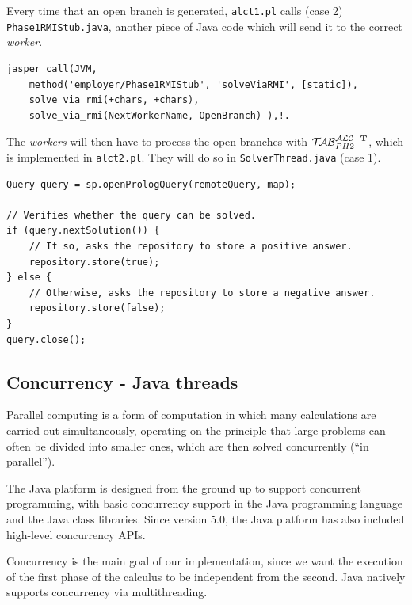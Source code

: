 \documentclass[a4paper, 11pt, oneside]{duthesis}
\newcommand{\tip}{{\bf T}}
\newcommand{\secondo}{\mathrel{{\mathcal{T}\!\mathcal{AB}}}_{PH 2}^{\mathcal{ALC}+\mbox{\scriptsize $\tip$}}}
\begin{document}
Every time that an open branch is generated, \verb$alct1.pl$ calls (case 2) \verb$Phase1RMIStub.java$, another piece of Java code which will send it to the correct \emph{worker}.

\begin{lstlisting}[caption={alct1.pl}, label={lst:alct1}, firstnumber=293]
jasper_call(JVM,
	method('employer/Phase1RMIStub', 'solveViaRMI', [static]),
	solve_via_rmi(+chars, +chars),                      
	solve_via_rmi(NextWorkerName, OpenBranch) ),!.
\end{lstlisting}\vspace{0.5cm}

The \emph{workers} will then have to process the open branches with $\secondo$, which is implemented in \verb$alct2.pl$. They will do so in \verb$SolverThread.java$ (case 1).

\begin{lstlisting}[caption={SolverThread.java}, label={lst:solvert}, firstnumber=22]
Query query = sp.openPrologQuery(remoteQuery, map);

// Verifies whether the query can be solved.
if (query.nextSolution()) {
	// If so, asks the repository to store a positive answer.
	repository.store(true);
} else {
	// Otherwise, asks the repository to store a negative answer.
	repository.store(false);
}
query.close();
\end{lstlisting}\vspace{0.5cm}


\subsection{Concurrency - Java threads}
Parallel computing is a form of computation in which many calculations are carried out simultaneously, operating on the principle that large problems can often be divided into smaller ones, which are then solved concurrently (``in parallel'')\cite{Almasi:1989:HPC:160438}.

The Java platform is designed from the ground up to support concurrent programming, with basic concurrency support in the Java programming language and the Java class libraries. Since version 5.0, the Java platform has also included high-level concurrency APIs\cite{oracle_thread}.

Concurrency is the main goal of our implementation, since we want the execution of the first phase of the calculus to be independent from the second. Java natively supports concurrency via multithreading.\\
\end{document}
